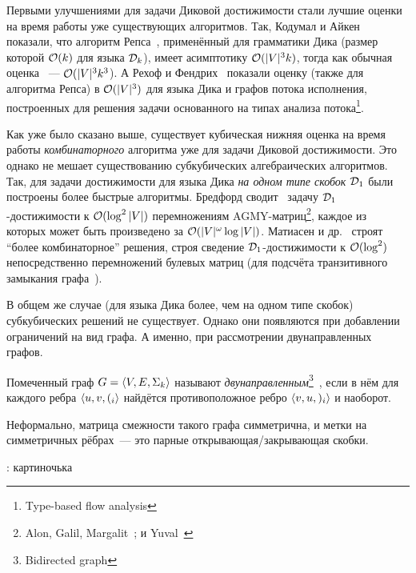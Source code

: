 Первыми улучшениями для задачи Диковой достижимости стали лучшие оценки на время работы уже существующих алгоритмов. Так, Кодумал и Айкен~\cite{Kodumal04} показали, что алгоритм Репса~\cite{Reps97}, применённый для грамматики Дика (размер которой $\mathcal{O}(k)$ для языка $\mathcal{D}_k$), имеет асимптотику $\mathcal{O}(|V|^3 k)$, тогда как обычная оценка ~--- $\mathcal{O}(|V|^3 k^3$). А Рехоф и Фендрих~\cite{Rehof01} показали оценку (также для алгоритма Репса) в $\mathcal{O}(|V|^3)$ для языка Дика и графов потока исполнения, построенных для решения задачи основанного на типах анализа потока\footnote{Type-based flow analysis}.

Как уже было сказано выше, существует кубическая нижняя оценка на время работы \textit{комбинаторного} алгоритма уже для задачи Диковой достижимости. Это однако не мешает существованию субкубических алгебраических алгоритмов. Так, для задачи достижимости для языка Дика \textit{на одном типе скобок} $\mathcal{D}_1$ были построены более быстрые алгоритмы. Бредфорд сводит~\cite{Bradford17} задачу $\mathcal{D}_1$-достижимости к $\mathcal{O}(\log^2 |V|)$ перемножениям AGMY-матриц\footnote{Alon, Galil, Margalit~\cite{Alon1997}; и Yuval~\cite{Yuval1976}}, каждое из которых может быть произведено за $\mathcal{O}(|V|^{\omega} \log |V|)$. Матиасен и др.~\cite{Mathiasen21} строят ``более комбинаторное'' решения, строя сведение $\mathcal{D}_1$-достижимости к $\mathcal{O}(\log^2)$ непосредственно перемножений булевых матриц (для подсчёта транзитивного замыкания графа~\cite{Aho1974}).

В общем же случае (для языка Дика более, чем на одном типе скобок) субкубических решений не существует. Однако они появляются при добавлении ограничений на вид графа. А именно, при рассмотрении двунаправленных графов. 

\begin{definition}
  Помеченный граф $G = \langle V, E, \Sigma_k \rangle$ называют \textit{двунаправленным}\footnote{Bidirected graph}~\cite{Yuan09}, если в нём для каждого ребра $\langle u, v, (_i \rangle$ найдётся противоположное ребро $\langle v, u, )_i \rangle$ и наоборот.

  Неформально, матрица смежности такого графа симметрична, и метки на симметричных рёбрах~--- это парные открывающая/закрывающая скобки.
\end{definition}

\TODO: картиночька

